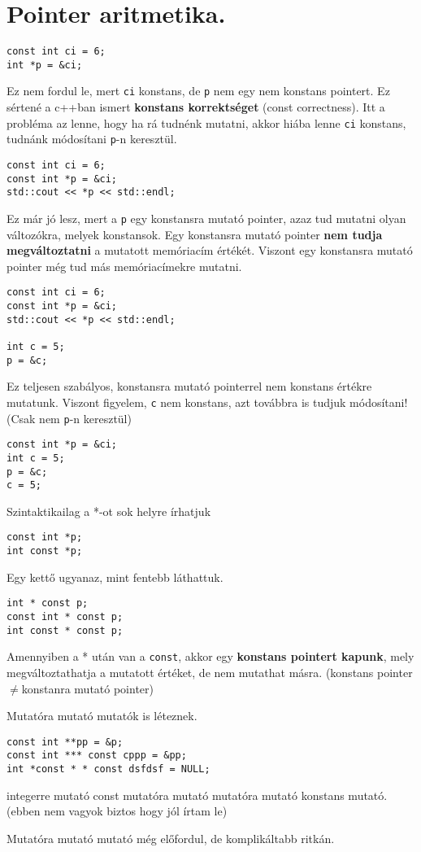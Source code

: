 \documentclass[a4paper,11.5pt]{article}
\begin{document}
	\section{Pointer aritmetika.}
	\begin{example}
		\begin{lstlisting}
const int ci = 6;
int *p = &ci;
		\end{lstlisting}
		Ez nem fordul le, mert \texttt{ci} konstans, de \texttt{p} nem egy nem konstans pointert. Ez sértené a c++ban ismert \textbf{konstans korrektséget} (const correctness). Itt a probléma az lenne, hogy ha rá tudnénk mutatni, akkor hiába lenne \texttt{ci} konstans, tudnánk módosítani \texttt{p}-n keresztül.
		\begin{lstlisting}
const int ci = 6;
const int *p = &ci;
std::cout << *p << std::endl;
		\end{lstlisting}
		Ez már jó lesz, mert a \texttt{p} egy konstansra mutató pointer, azaz tud mutatni olyan változókra, melyek konstansok. Egy konstansra mutató pointer \textbf{nem tudja megváltoztatni} a mutatott memóriacím értékét. Viszont egy konstansra mutató pointer még tud más memóriacímekre mutatni.
		\begin{lstlisting}
const int ci = 6;
const int *p = &ci;
std::cout << *p << std::endl;

int c = 5;
p = &c;
		\end{lstlisting}
		Ez teljesen szabályos, konstansra mutató pointerrel nem konstans értékre mutatunk. Viszont figyelem, \texttt{c} nem konstans, azt továbbra is tudjuk módosítani! (Csak nem \texttt{p}-n keresztül)
		\begin{lstlisting}
const int *p = &ci;
int c = 5;
p = &c;
c = 5;
		\end{lstlisting}
	\end{example}
	\begin{example}
		Szintaktikailag a *-ot sok helyre írhatjuk
		\begin{lstlisting}
const int *p;
int const *p;
		\end{lstlisting}
		Egy kettő ugyanaz, mint fentebb láthattuk.
		\begin{lstlisting}
int * const p;
const int * const p;
int const * const p;
		\end{lstlisting} 
		Amennyiben a * után van a \texttt{const}, akkor egy \textbf{konstans pointert kapunk}, mely megváltoztathatja a mutatott értéket, de nem mutathat másra. (konstans pointer \quad $\not=$\quad konstanra mutató pointer)
	\end{example}
	\begin{example}
		Mutatóra mutató mutatók is léteznek.
		\begin{lstlisting}
const int **pp = &p;
const int *** const cppp = &pp;
int *const * * const dsfdsf = NULL;
		\end{lstlisting}
		integerre mutató const mutatóra mutató mutatóra mutató konstans mutató. (ebben nem vagyok biztos hogy jól írtam le)
	\end{example}
	\begin{note}
		Mutatóra mutató mutató még előfordul, de komplikáltabb ritkán.
	\end{note}
\end{document}
